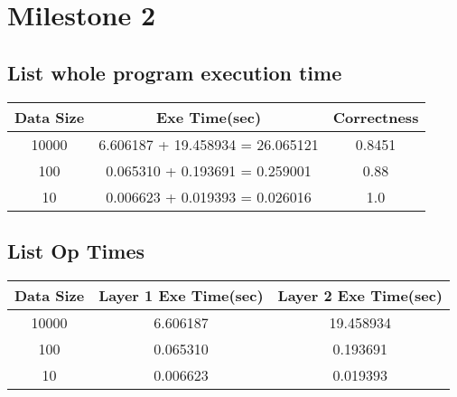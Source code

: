 \documentclass[12pt]{article}
\begin{document}
\section{Milestone 2}

\subsection{List whole program execution time}
\begin{center}
    \begin{tabular}{ c | c | c }
    Data Size & Exe Time(sec) & Correctness\\ 
    \hline    
    10000 & 6.606187 + 19.458934 = 26.065121 & 0.8451\\  
    100 & 0.065310 + 0.193691 = 0.259001 & 0.88\\
    10 & 0.006623 + 0.019393 = 0.026016 & 1.0
    \end{tabular}
\end{center}

\subsection{List Op Times}
\begin{center}
    \begin{tabular}{ c | c | c }
    Data Size & Layer 1 Exe Time(sec) & Layer 2 Exe Time(sec)\\ 
    \hline    
    10000 & 6.606187 & 19.458934\\  
    100 & 0.065310 & 0.193691\\
    10 & 0.006623 & 0.019393
    \end{tabular}
\end{center}
\end{document}
